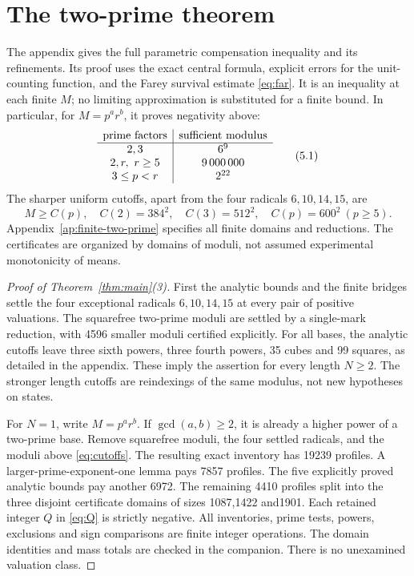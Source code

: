 \documentclass[11pt]{article}
\theoremstyle{definition}\newtheorem{definition}[theorem]{Definition}
\theoremstyle{remark}\newtheorem{remark}[theorem]{Remark}
\begin{document}
\section{The two-prime theorem}\label{sec:two}
The appendix gives the full parametric compensation inequality and its
refinements. Its proof uses the exact central formula, explicit errors
for the unit-counting function, and the Farey survival estimate
\eqref{eq:far}. It is an inequality at each finite \(M\);
no limiting approximation is substituted for a finite bound.
In particular, for \(M=p^a r^b\), it proves negativity above:
\[
 \begin{array}{c|c}
 \hbox{prime factors}&\hbox{sufficient modulus}\\\hline
 2,3 &6^9\\
 2,r,\ r\ge5 &9\,000\,000\\
 3\le p<r &2^{22}
 \end{array}                                      \tag{5.1}
\]
The sharper uniform cutoffs, apart from the four radicals
\(6,10,14,15\), are
\[
 M\ge C(p),\quad
 C(2)=384^2,\quad C(3)=512^2,\quad C(p)=600^2\ (p\ge5).                 \tag{5.2}\label{eq:cutoffs}
\]
Appendix~\ref{ap:finite-two-prime} specifies all finite domains and reductions.
The certificates are organized by domains of moduli, not assumed
experimental monotonicity of means.

\begin{proof}[Proof of Theorem~\ref{thm:main}(3)]
First the analytic bounds and the finite bridges settle the four
exceptional radicals \(6,10,14,15\) at every pair of positive valuations.
The squarefree two-prime moduli are settled by a single-mark reduction,
with 4596 smaller moduli certified explicitly.
For all bases, the analytic cutoffs leave three sixth powers, three
fourth powers, 35 cubes and 99 squares, as detailed in the appendix.
These imply the assertion for every length \(N\ge2\).
The stronger length cutoffs are reindexings of the same modulus, not
new hypotheses on states.

For \(N=1\), write \(M=p^a r^b\). If \(\gcd(a,b)\ge2\), it is already
a higher power of a two-prime base. Remove squarefree moduli, the four
settled radicals, and the moduli above \eqref{eq:cutoffs}.
The resulting exact inventory has 19239 profiles.
A larger-prime-exponent-one lemma pays 7857 profiles.
The five explicitly proved analytic bounds pay another 6972.
The remaining 4410 profiles split into the three disjoint certificate
domains of sizes 1087,1422 and1901. Each retained integer \(Q\) in
\eqref{eq:Q} is strictly negative.
All inventories, prime tests, powers, exclusions and sign comparisons
are finite integer operations. The domain identities and mass totals
are checked in the companion. There is no unexamined valuation class.
\end{proof}
\end{document}
